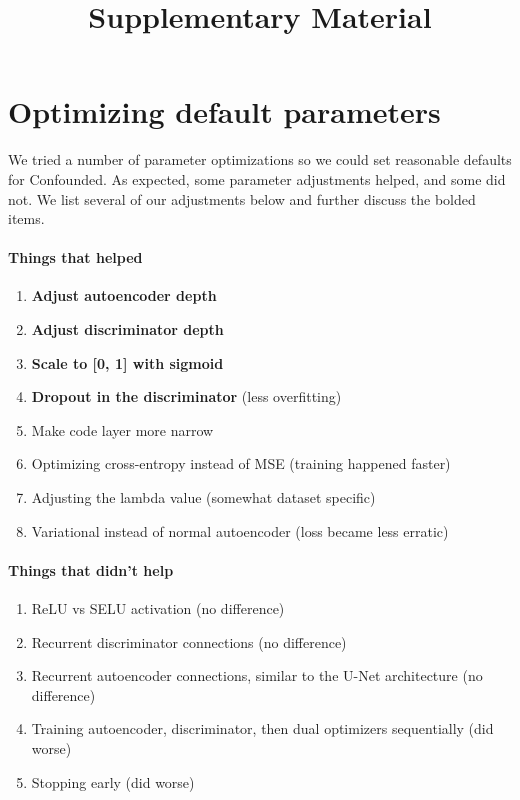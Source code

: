 \documentclass{article}
\begin{document}
\title{Supplementary Material}
\date{\vspace{-5ex}}

\maketitle

\doublespacing

\section{Optimizing default parameters}

We tried a number of parameter optimizations so we could set reasonable defaults for Confounded.
As expected, some parameter adjustments helped, and some did not.
We list several of our adjustments below and further discuss the bolded items.

\paragraph{Things that helped}

\begin{enumerate}
	\item \textbf{Adjust autoencoder depth}
	\item \textbf{Adjust discriminator depth}
	\item \textbf{Scale to [0, 1] with sigmoid}
	\item \textbf{Dropout in the discriminator} (less overfitting) %
	\item Make code layer more narrow
	\item Optimizing cross-entropy instead of MSE (training happened faster) %
	\item Adjusting the lambda value (somewhat dataset specific)
	\item Variational instead of normal autoencoder \cite{kingma_auto-encoding_2013} (loss became less erratic)
\end{enumerate}

\paragraph{Things that didn't help}

\begin{enumerate}
	\item ReLU vs SELU \cite{klambauer_self-normalizing_2017} activation (no difference)
	\item Recurrent discriminator connections (no difference) %
	\item Recurrent autoencoder connections, similar to the U-Net architecture \cite{ronneberger_u-net_2015} (no difference)
	\item Training autoencoder, discriminator, then dual optimizers sequentially (did worse)
	\item Stopping early (did worse)
\end{enumerate}
\end{document}
